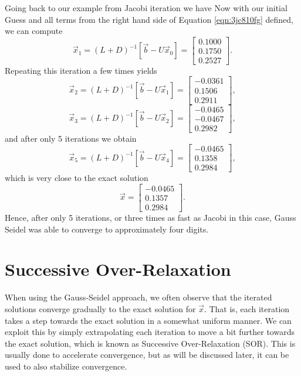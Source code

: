 Going back to our example from Jacobi iteration we have
Now with our initial Guess and all terms from the right hand side of Equation \ref{eqn:3jc810fg} defined, we can compute
\begin{equation}
	\vec{x}_{1} = (L + D)^{-1}\left[ \vec{b} - U\vec{x}_0 \right] = \begin{bmatrix}
	    0.1000 \\
	    0.1750 \\
			0.2527
	\end{bmatrix}.
\end{equation}
Repeating this iteration a few times yields
\begin{equation}
	\vec{x}_{2} = (L + D)^{-1}\left[ \vec{b} - U\vec{x}_1 \right] = \begin{bmatrix}
	    -0.0361 \\
	    0.1506 \\
			0.2911
	\end{bmatrix},
\end{equation}
\begin{equation}
	\vec{x}_{3} = (L + D)^{-1}\left[ \vec{b} - U\vec{x}_2 \right] = \begin{bmatrix}
	    -0.0465 \\
	    -0.0467 \\
			0.2982
	\end{bmatrix},
\end{equation}
and after only 5 iterations we obtain
\begin{equation}
		\vec{x}_{5} = (L + D)^{-1}\left[ \vec{b} - U\vec{x}_4 \right] = \begin{bmatrix}
	    -0.0465 \\
	    0.1358 \\
			0.2984
	\end{bmatrix},
\end{equation}
which is very close to the exact solution
\begin{equation}
	\vec{x} = \begin{bmatrix}
	    -0.0465 \\
	    0.1357 \\
			0.2984
	\end{bmatrix}.
\end{equation}
Hence, after only 5 iterations, or three times as fast as Jacobi in this case, Gauss Seidel was able to converge to approximately four digits.

\section{Successive Over-Relaxation}
When using the Gauss-Seidel approach, we often observe that the iterated solutions converge gradually to the exact solution for $\vec{x}$. That is, each iteration takes a step towards the exact solution in a somewhat uniform manner. We can exploit this by simply extrapolating each iteration to move a bit further towards the exact solution, which is known as Successive Over-Relaxation (SOR). This is usually done to accelerate convergence, but as will be discussed later, it can be used to also stabilize convergence.

